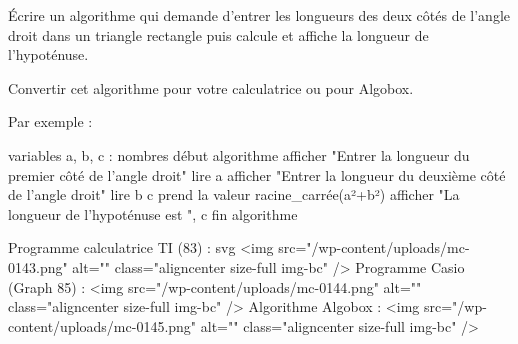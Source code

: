 
%
Écrire un algorithme qui demande d'entrer les longueurs des deux côtés de l'angle droit dans un triangle rectangle puis calcule et affiche la longueur de l'hypoténuse.
\par
Convertir cet algorithme pour votre calculatrice ou pour Algobox.
\begin{corrige}
     Par exemple :
\begin{code}
variables
   a, b, c : nombres
début algorithme
   afficher "Entrer la longueur du premier côté de l'angle droit"
   lire a
   afficher "Entrer la longueur du deuxième côté de l'angle droit"
   lire b
   c prend la valeur racine_carrée(a²+b²)
   afficher "La longueur de l'hypoténuse est ", c
fin algorithme
\end{code}
     Programme calculatrice TI (83) :
svg
     <img src="/wp-content/uploads/mc-0143.png" alt="" class="aligncenter size-full  img-bc" />
     Programme Casio (Graph 85) :
     <img src="/wp-content/uploads/mc-0144.png" alt="" class="aligncenter size-full  img-bc" />
     Algorithme Algobox :
     <img src="/wp-content/uploads/mc-0145.png" alt="" class="aligncenter size-full  img-bc" />
\end{corrige}
